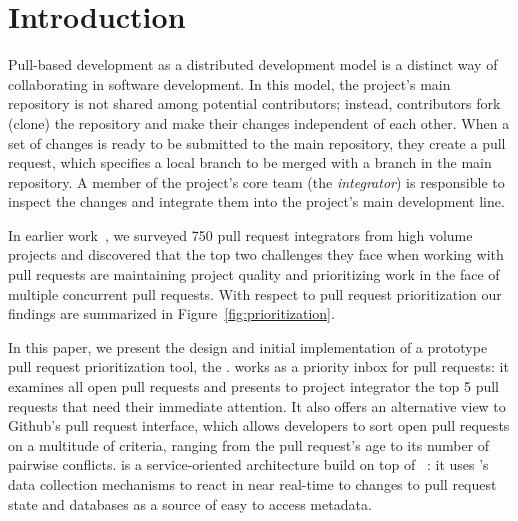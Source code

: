 \documentclass[conference]{IEEEtran}
\begin{document}



\section{Introduction}

Pull-based development as a distributed development model is a distinct way of
collaborating in software development. In this model, the project's main
repository is not shared among potential contributors; instead, contributors
fork (clone) the repository and make their changes independent of each other.
When a set of changes is ready to be submitted to the main repository, they
create a pull request, which specifies a local branch to be merged with a branch
in the main repository. A member of the project's core team (the
\emph{integrator}) is responsible to inspect the changes and integrate them into
the project's main development line.

In earlier work~\cite{GZSD15}, we surveyed 750 pull request integrators from high
volume projects and discovered that the top two challenges they face when
working with pull requests are maintaining project quality and prioritizing work
in the face of multiple concurrent pull requests. With respect to pull request
prioritization our findings are summarized in Figure~\ref{fig:prioritization}.

In this paper, we present the design and initial implementation of a prototype
pull request prioritization tool, the \prioritizer. \prioritizer works as a
priority inbox for pull requests: it examines all open pull requests and
presents to project integrator the top 5 pull requests that need their immediate
attention. It also offers an alternative view to Github's pull request
interface, which allows developers to sort open pull requests on a multitude of
criteria, ranging from the pull request's age to its number of pairwise
conflicts. \prioritizer is a service-oriented architecture build on top of
\ghtorrent~\cite{G13}: it uses \ghtorrent's data collection mechanisms to react in near
real-time to changes to pull request state and databases as a source of easy to
access metadata.
\end{document}
